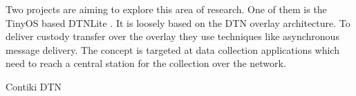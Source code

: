 Two projects are aiming to explore this area of research. One of them is the
TinyOS based DTNLite \cite{dtnlite}. It is loosely based on the DTN overlay
architecture. To deliver custody transfer  over the overlay they use techniques
like asynchronous message delivery. The concept is targeted at data collection
applications which need to reach a central station for the collection over the
network.

Contiki DTN

